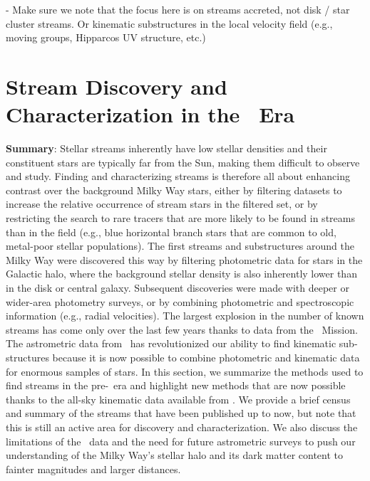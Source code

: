 \documentclass[final,5p,times,twocolumn,authoryear]{elsarticle}
\begin{document}
- Make sure we note that the focus here is on streams accreted, not disk / star cluster
streams. Or kinematic substructures in the local velocity field (e.g., moving groups, Hipparcos UV structure, etc.)

\section{Stream Discovery and Characterization in the \gaia\ Era}
\label{sec:discovery}


\textbf{Summary}: Stellar streams inherently have low stellar densities and their
constituent stars are typically far from the Sun, making them difficult to observe and
study.
Finding and characterizing streams is therefore all about enhancing contrast over the
background Milky Way stars, either by filtering datasets to increase the relative
occurrence of stream stars in the filtered set, or by restricting the search to rare
tracers that are more likely to be found in streams than in the field (e.g., blue
horizontal branch stars that are common to old, metal-poor stellar populations).
The first streams and substructures around the Milky Way were discovered this way by
filtering photometric data for stars in the Galactic halo, where the background stellar
density is also inherently lower than in the disk or central galaxy.
Subsequent discoveries were made with deeper or wider-area photometry surveys, or by
combining photometric and spectroscopic information (e.g., radial velocities).
The largest explosion in the number of known streams has come only over the last few
years thanks to data from the \gaia\ Mission.
The astrometric data from \gaia\ has revolutionized our ability to find kinematic
sub-structures because it is now possible to combine photometric and kinematic data for
enormous samples of stars.
In this section, we summarize the methods used to find streams in the pre-\gaia\ era and
highlight new methods that are now possible thanks to the all-sky kinematic data
available from \gaia.
We provide a brief census and summary of the streams that have been published up to now,
but note that this is still an active area for discovery and characterization.
We also discuss the limitations of the \gaia\ data and the need for future astrometric
surveys to push our understanding of the Milky Way's stellar halo and its dark matter
content to fainter magnitudes and larger distances.
\end{document}
